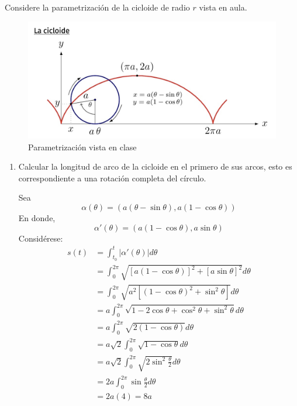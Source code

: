 \begin{problema}
    Considere la parametrización de la cicloide de radio $r$ vista en aula.
    \begin{figure}[H]
        \centering
        \includegraphics[scale=0.5]{Problemas/cicloide.png}
        \caption{Parametrización vista en clase}
    \end{figure}
    \begin{enumerate}
        \item Calcular la longitud de arco de la cicloide en el primero de sus arcos, esto es correspondiente a una rotación completa del círculo.
        \begin{sol}
            Sea 
            $$\alpha(\theta) = \left(a\left(\theta -\sin \theta\right),a(1-\cos\theta)\right)$$
            En donde, 
            $$\alpha'(\theta)=\left(a\left(1 -\cos \theta\right),
            a\sin \theta\right) $$
            Considérese: 
            \begin{align*}
                s(t) &= \int_{t_0}^{t}|\alpha'(\theta)|d\theta\\
                &= \int_0^{2\pi}\sqrt{\left[a(1-\cos\theta)\right]^2 + \left[a\sin\theta\right]^2}d\theta\\
                &=  \int_0^{2\pi}\sqrt{a^2\left[(1-\cos \theta)^2+\sin^2\theta\right]}d\theta\\
                &= a\int_0^{2\pi}\sqrt{1-2\cos\theta +\cos^2\theta +\sin^2\theta }d\theta\\
                &= a\int_0^{2\pi}\sqrt{2(1-\cos\theta)}d\theta\\
                &= a\sqrt{2}\int_0^{2\pi}\sqrt{1-\cos\theta}d\theta\\
                &= a\sqrt{2}\int_0^{2\pi}\sqrt{2\sin^2\frac{\theta}{2} }d\theta\\
                &= 2a \int_0^{2\pi}\sin \frac{\theta}{2}d\theta\\
                &= 2a(4)= 8a 
            \end{align*}
        \end{sol}


\end{enumerate}
\end{problema}
